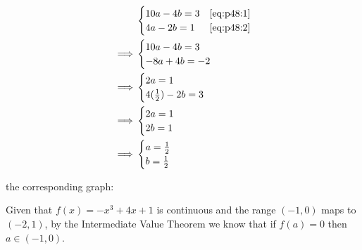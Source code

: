 \documentclass{../../../classes/anal}
\begin{document}
    \begin{equation}
        \begin{aligned}
            &\begin{cases}
                10a - 4b = 3 & \eqref{eq:p48:1} \\
                4a - 2b = 1 & \eqref{eq:p48:2}
            \end{cases}
            \\ \implies
            &\begin{cases}
                10a - 4b = 3 \\
                -8a + 4b = -2
            \end{cases}
            \\ \implies
            &\begin{cases}
                2a = 1 \\
                4({1 \over 2}) - 2b = 3
            \end{cases}
            \\ \implies
            &\begin{cases}
                2a = 1 \\
                2b = 1
            \end{cases}
            \\ \implies
            &\begin{cases}
                a = {1 \over 2} \\
                b = {1 \over 2}
            \end{cases}
        \end{aligned}
    \end{equation}

    the corresponding graph:



    Given that \(f(x) = -x^3 + 4x + 1\) is continuous and the range \((-1, 0)\) maps to \((-2, 1)\), by the Intermediate Value Theorem we know that if \(f(a) = 0\) then \(a \in (-1, 0)\).
\end{document}
